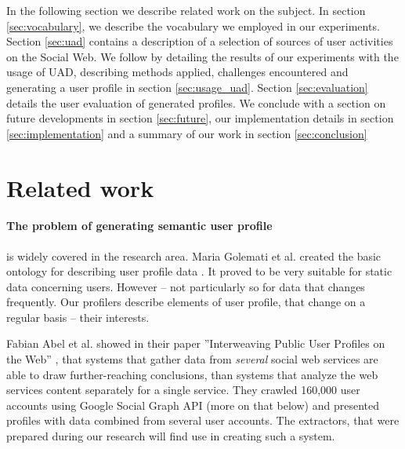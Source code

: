 In the following section we describe related work on the subject. In section \ref{sec:vocabulary}, we describe the
vocabulary we employed in our experiments. Section \ref{sec:uad} contains a description of a selection of sources
of user activities on the Social Web. We follow by detailing the results of our experiments
with the usage of UAD, describing methods applied, challenges encountered and generating a user profile in
section \ref{sec:usage_uad}. Section \ref{sec:evaluation} details the user evaluation of generated profiles.
We conclude with a section on future developments in section \ref{sec:future}, our implementation details
in section \ref{sec:implementation} and a summary of our work in section \ref{sec:conclusion}

\section{Related work}

\paragraph{The problem of generating semantic user profile} is widely covered in the
research area. Maria Golemati et al. created the basic ontology for describing
user profile data \cite{creating-ontology-for-user-profile}. It proved to be
very suitable for static data concerning users. However -- not particularly
so for data that changes frequently. Our profilers describe elements of user
profile, that change on a regular basis -- their interests.  

Fabian Abel et al. showed in their
paper ''Interweaving Public User Profiles on the Web'' \cite{public-profiles},
that systems that gather data from \textit{several} social web services are
able to draw further-reaching conclusions, than systems that analyze the web
services content separately for a single service. They crawled 160,000 user
accounts using Google Social Graph API (more on that below) and presented
profiles with data combined from several user accounts.  The extractors, that
were prepared during our research will find use in creating such a system.

